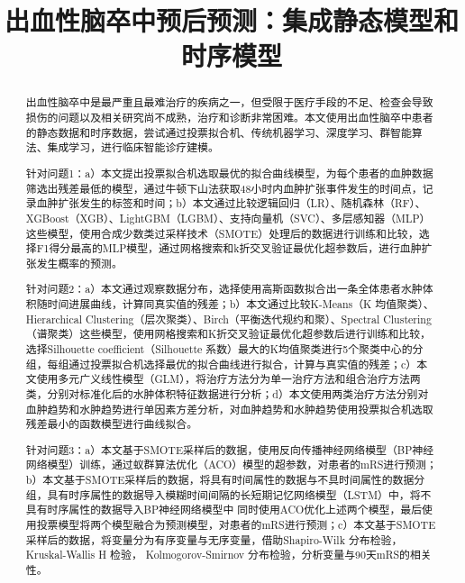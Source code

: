 \documentclass[bwprint]{gmcmthesis}
\title{出血性脑卒中预后预测：集成静态模型和时序模型}
\begin{document}
 \maketitle

\begin{abstract}

出血性脑卒中是最严重且最难治疗的疾病之一，但受限于医疗手段的不足、检查会导致损伤的问题以及相关研究尚不成熟，治疗和诊断非常困难。本文使用出血性脑卒中患者的静态数据和时序数据，尝试通过投票拟合机、传统机器学习、深度学习、群智能算法、集成学习，进行临床智能诊疗建模。

针对问题1：a）本文提出投票拟合机选取最优的拟合曲线模型，为每个患者的血肿数据筛选出残差最低的模型，通过牛顿下山法获取48小时内血肿扩张事件发生的时间点，记录血肿扩张发生的标签和时间；b）本文通过比较逻辑回归（LR）、随机森林（RF）、XGBoost（XGB）、LightGBM（LGBM）、支持向量机（SVC）、多层感知器（MLP）这些模型，使用合成少数类过采样技术（SMOTE）处理后的数据进行训练和比较，选择F1得分最高的MLP模型，通过网格搜索和k折交叉验证最优化超参数后，进行血肿扩张发生概率的预测。

针对问题2：a）本文通过观察数据分布，选择使用高斯函数拟合出一条全体患者水肿体积随时间进展曲线，计算同真实值的残差；b）本文通过比较K-Means（K 均值聚类）、Hierarchical Clustering（层次聚类）、Birch（平衡迭代规约和聚）、Spectral Clustering（谱聚类）这些模型，使用网格搜索和K折交叉验证最优化超参数后进行训练和比较，选择Silhouette coefficient（Silhouette 系数）最大的K均值聚类进行5个聚类中心的分组，每组通过投票拟合机选择最优的拟合曲线进行拟合，计算与真实值的残差；c）本文使用多元广义线性模型（GLM），将治疗方法分为单一治疗方法和组合治疗方法两类，分别对标准化后的水肿体积特征数据进行分析；d）本文使用两类治疗方法分别对血肿趋势和水肿趋势进行单因素方差分析，对血肿趋势和水肿趋势使用投票拟合机选取残差最小的函数模型进行曲线拟合。 

针对问题3：a）本文基于SMOTE采样后的数据，使用反向传播神经网络模型（BP神经网络模型）训练，通过蚁群算法优化（ACO）模型的超参数，对患者的mRS进行预测；b）本文基于SMOTE采样后的数据，将具有时间属性的数据与不具时间属性的数据分组，具有时序属性的数据导入模糊时间间隔的长短期记忆网络模型（LSTM）中，将不具有时序属性的数据导入BP神经网络模型中
同时使用ACO优化上述两个模型，最后使用投票模型将两个模型融合为预测模型，对患者的mRS进行预测；c）本文基于SMOTE采样后的数据，将变量分为有序变量与无序变量，借助Shapiro-Wilk 分布检验，Kruskal-Wallis H 检验， Kolmogorov-Smirnov
分布检验，分析变量与90天mRS的相关性。 

\end{abstract}
\end{document}
